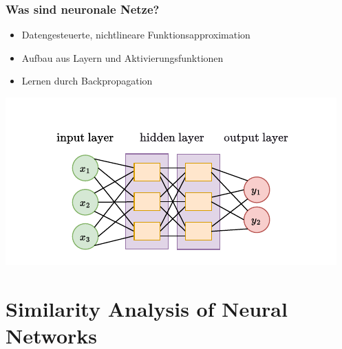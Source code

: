\begingroup
\frametitle{Was sind neuronale Netze?}
\begin{frame}[plain]
	\begin{minipage}[t]{0.48\linewidth}
		\vspace*{-0.5em}
		\begin{itemize}
			\item Datengesteuerte, nichtlineare Funktionsapproximation
			\item Aufbau aus Layern und Aktivierungsfunktionen
			\item Lernen durch Backpropagation
		\end{itemize}
	\end{minipage}
	\hfill
	\begin{minipage}[t]{0.50\linewidth}
		\vspace*{-0.5em}
		\centering
		\includegraphics[width=\linewidth]{BilderPräsentation/NN_ausgerichtet.drawio.pdf}
	\end{minipage}
\end{frame}

\endgroup


\section{Similarity Analysis of Neural Networks}

